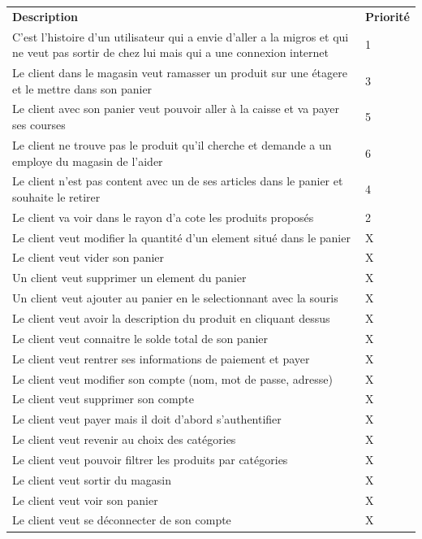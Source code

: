 \documentclass[12pt]{article}
\begin{document}
\begin{center}
    \begin{tabular}{ | L{13cm} || C{2cm} | }
        \hline
        \textbf{Description} & \textbf{Priorité}\\
        \hhline{|=||=|}
        C'est l'histoire d'un utilisateur qui a envie d'aller a la migros et qui ne veut pas sortir de chez lui mais qui a une connexion internet & 1\\
        \hline
        Le client dans le magasin veut ramasser un produit sur une étagere et le mettre dans son panier & 3\\
        \hline
        Le client avec son panier veut pouvoir aller à la caisse et va payer ses courses & 5\\
        \hline
        Le client ne trouve pas le produit qu'il cherche et demande a un employe du magasin de l'aider & 6\\
        \hline
        Le client n'est pas content avec un de ses articles dans le panier et souhaite le retirer & 4\\
        \hline
        Le client va voir dans le rayon d'a cote les produits proposés & 2\\
        \hline
        Le client veut modifier la quantité d'un element situé dans le panier & X\\
        \hline
        Le client veut vider son panier & X\\
        \hline
        Un client veut supprimer un element du panier & X\\
        \hline
        Un client veut ajouter au panier en le selectionnant avec la souris & X\\
        \hline
        Le client veut avoir la description du produit en cliquant dessus & X\\
        \hline
        Le client veut connaitre le solde total de son panier & X\\
        \hline
        Le client veut rentrer ses informations de paiement et payer & X\\
        \hline
        Le client veut modifier son compte (nom, mot de passe, adresse) & X\\
        \hline
        Le client veut supprimer son compte & X\\
        \hline
        Le client veut payer mais il doit d'abord s'authentifier & X\\
        \hline
        Le client veut revenir au choix des catégories & X\\
        \hline
        Le client veut pouvoir filtrer les produits par catégories & X\\
        \hline
        Le client veut sortir du magasin & X\\
        \hline
        Le client veut voir son panier & X\\
        \hline
        Le client veut se déconnecter de son compte & X\\
        \hline
    \end{tabular}
\end{center}
\end{document}
